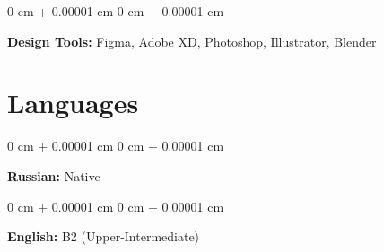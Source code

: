 \documentclass[10pt, letterpaper]{article}
\newenvironment{onecolentry}{
    \begin{adjustwidth}{
        0 cm + 0.00001 cm
    }{
        0 cm + 0.00001 cm
    }
}{
    \end{adjustwidth}
} %
\begin{document}
        \vspace{0.2 cm}

        \begin{onecolentry}
            \textbf{Design Tools:} Figma, Adobe XD, Photoshop, Illustrator, Blender
        \end{onecolentry}


    
    \section{Languages}
    \begin{onecolentry}
        \textbf{Russian:} Native
    \end{onecolentry}
    \vspace{0.2 cm}
    \begin{onecolentry}
        \textbf{English:} B2 (Upper-Intermediate)
    \end{onecolentry}
\end{document}
